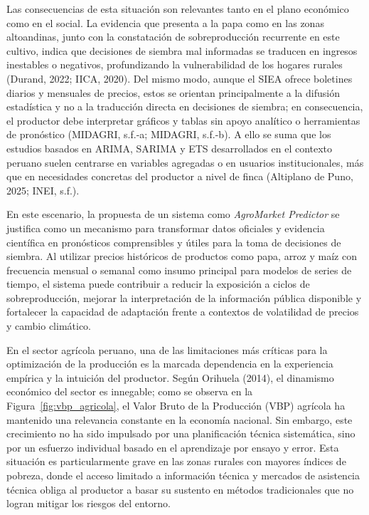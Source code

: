 \documentclass[12pt, a4paper]{report}
\begin{document}
Las consecuencias de esta situación son relevantes tanto en el plano económico como en el social. La evidencia que presenta a la papa como  en las zonas altoandinas, junto con la constatación de sobreproducción recurrente en este cultivo, indica que decisiones de siembra mal informadas se traducen en ingresos inestables o negativos, profundizando la vulnerabilidad de los hogares rurales (Durand, 2022; IICA, 2020). Del mismo modo, aunque el SIEA ofrece boletines diarios y mensuales de precios, estos se orientan principalmente a la difusión estadística y no a la traducción directa en decisiones de siembra; en consecuencia, el productor debe interpretar gráficos y tablas sin apoyo analítico o herramientas de pronóstico (MIDAGRI, s.f.-a; MIDAGRI, s.f.-b). A ello se suma que los estudios basados en ARIMA, SARIMA y ETS desarrollados en el contexto peruano suelen centrarse en variables agregadas o en usuarios institucionales, más que en necesidades concretas del productor a nivel de finca (Altiplano de Puno, 2025; INEI, s.f.).

En este escenario, la propuesta de un sistema como \emph{AgroMarket Predictor} se justifica como un mecanismo para transformar datos oficiales y evidencia científica en pronósticos comprensibles y útiles para la toma de decisiones de siembra. Al utilizar precios históricos de productos como papa, arroz y maíz con frecuencia mensual o semanal como insumo principal para modelos de series de tiempo, el sistema puede contribuir a reducir la exposición a ciclos de sobreproducción, mejorar la interpretación de la información pública disponible y fortalecer la capacidad de adaptación frente a contextos de volatilidad de precios y cambio climático.

En el sector agrícola peruano, una de las limitaciones más críticas para la optimización de la producción es la marcada dependencia en la experiencia empírica y la intuición del productor. Según Orihuela (2014), el dinamismo económico del sector es innegable; como se observa en la Figura~\ref{fig:vbp_agricola}, el Valor Bruto de la Producción (VBP) agrícola ha mantenido una relevancia constante en la economía nacional. Sin embargo, este crecimiento no ha sido impulsado por una planificación técnica sistemática, sino por un esfuerzo individual basado en el aprendizaje por ensayo y error. Esta situación es particularmente grave en las zonas rurales con mayores índices de pobreza, donde el acceso limitado a información técnica y mercados de asistencia técnica obliga al productor a basar su sustento en métodos tradicionales que no logran mitigar los riesgos del entorno.
\end{document}
